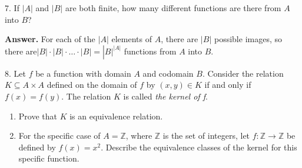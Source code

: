 \documentclass[10pt,]{book}
\theoremstyle{plain}
\theoremstyle{definition}
\theoremstyle{definition}
\theoremstyle{definition}
\begin{document}
\begin{exercisegroup}
\item[7.]\hypertarget{exercise-7}{}If \(\lvert A \rvert\) and \(\lvert B \rvert\) are both finite, how many different functions are there from \(A\) into \(B\)?%
\par\smallskip
\par\smallskip
\noindent\textbf{Answer.}\hypertarget{answer-3}{}\quad
 For each of the \(\lvert A \rvert \) elements of \(A\), there are \(\lvert B \rvert\) possible images, so there are\(\lvert B \rvert\cdot \lvert B \rvert\cdot \ldots \cdot \lvert B \rvert=\left\lvert B \rvert^{\lvert A \rvert}\right.\) functions from \(A\) into \(B\).%
\item[8.]\hypertarget{exercise-8}{} Let \(f\) be a function with domain \(A\) and codomain \(B\). Consider the relation \(K \subseteq  A \times  A\) defined
on the domain of \(f\) by \((x, y) \in  K\) if and only if \(f(x) = f(y)\). The relation \(K\) is called \textit{ the kernel of f}.%
\par
\leavevmode%
\begin{enumerate}[label=\alph*]
\item\hypertarget{li-25}{} Prove that \(K\) is an equivalence relation.%
\item\hypertarget{li-26}{} For the specific case of \(A = \mathbb{Z}\), where \(\mathbb{Z}\) is the set of integers, let \(f: \mathbb{Z} \rightarrow  \mathbb{Z}\) be defined by \(f(x) = x^2\). Describe the equivalence classes of the kernel for this specific function.%
\end{enumerate}
%
\par\smallskip
\end{exercisegroup}
\par\smallskip\noindent
\typeout{************************************************}
\typeout{************************************************}
\end{document}
